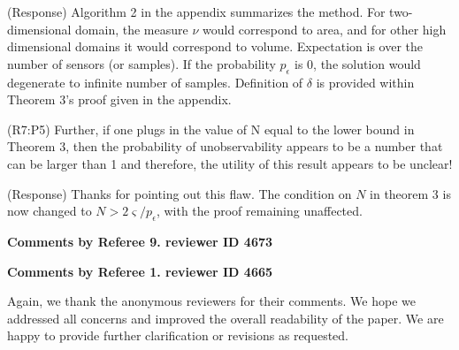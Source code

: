 \documentclass{letter}
\begin{document}
{\color{red}(Response)}  Algorithm 2 in the appendix summarizes the method. For two-dimensional domain, the measure $ \nu $ would correspond to area, and for other high dimensional domains it would correspond to volume. Expectation is over the number of sensors (or samples). If the probability $ p_\epsilon $ is 0, the solution would degenerate to infinite number of samples. Definition of $ \delta $ is provided  within Theorem 3's proof given in the appendix.  

{\color{red}(R7:P5)} Further, if one plugs in the value of N equal to the lower bound in Theorem 3, then the probability of unobservability appears to be a number that can be larger than 1 and therefore, the utility of this result appears to be unclear!

{\color{red}(Response)} Thanks for pointing out this flaw. The condition on $ N $ in theorem 3 is now changed to $ N > 2\varsigma/p_\epsilon $, with the proof remaining unaffected. 

{\bf Comments by Referee 9. reviewer ID 4673}

{\bf Comments by Referee 1. reviewer ID 4665}

Again, we thank the anonymous reviewers for their comments. We hope we 
addressed all concerns and improved the overall readability of the paper. We are happy to provide further clarification or revisions as requested.





\small
%


\end{document}
